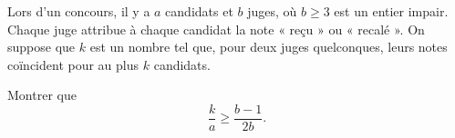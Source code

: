 Lors d'un concours, il y a $a$ candidats et $b$ juges, où $b \ge 3$ est un entier impair. Chaque juge attribue à chaque candidat la note « reçu » ou « recalé ». On suppose que $k$ est un nombre tel que, pour deux juges quelconques, leurs notes coïncident pour au plus $k$ candidats.

Montrer que
\[ \frac{k}{a} \ge \frac{b-1}{2b}. \]
